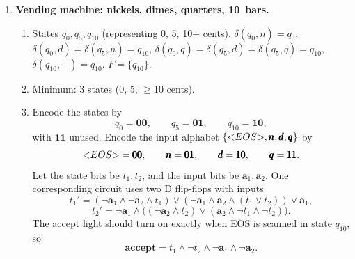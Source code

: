 \documentclass[11pt,openany]{book}
\def\<{\text{\textless}}
\def\>{\text{\textgreater}}
\def\cent{\text{\textcent}}
\begin{document}
\begin{enumerate}[{1.}1.]
\begin{enumerate}
\item 11 states.

\item The minimum is 11 states (must track exact amount from 0 to 10 cents).
\end{enumerate}

\item \textbf{Vending machine: nickels, dimes, quarters, 10\cent\ bars.}

\begin{enumerate}
\item States $q_0,q_5,q_{10}$ (representing 0, 5, 10+ cents). $\delta(q_0,n)=q_5$, $\delta(q_0,d)=\delta(q_5,n)=q_{10}$, $\delta(q_0,q)=\delta(q_5,d)=\delta(q_5,q)=q_{10}$, $\delta(q_{10},-)=q_{10}$. $F=\{q_{10}\}$.

\item Minimum: 3 states (0, 5, $\geq$10 cents).

\item Encode the states by
\[
q_0=\pmb{00},\qquad q_5=\pmb{01},\qquad q_{10}=\pmb{10},
\]
with $\pmb{11}$ unused. Encode the input alphabet $\{\<EOS\>,\pmb{n},\pmb{d},\pmb{q}\}$ by
\[
\<EOS\>=\pmb{00},\qquad \pmb{n}=\pmb{01},\qquad \pmb{d}=\pmb{10},\qquad \pmb{q}=\pmb{11}.
\]
Let the state bits be $t_1,t_2$, and the input bits be $\pmb{a}_1,\pmb{a}_2$. One corresponding circuit uses two D flip-flops with inputs
\[
t_1'=(\neg \pmb{a}_1\wedge \neg \pmb{a}_2\wedge t_1)\vee
(\neg \pmb{a}_1\wedge \pmb{a}_2\wedge (t_1\vee t_2))\vee \pmb{a}_1,
\]
\[
t_2'=\neg \pmb{a}_1\wedge\big((\neg \pmb{a}_2\wedge t_2)\vee
(\pmb{a}_2\wedge \neg t_1\wedge \neg t_2)\big).
\]
The accept light should turn on exactly when \<EOS\> is scanned in state $q_{10}$, so
\[
\textbf{accept}=t_1\wedge \neg t_2\wedge \neg \pmb{a}_1\wedge \neg \pmb{a}_2.
\]


\end{enumerate}
\end{enumerate}
\end{document}
